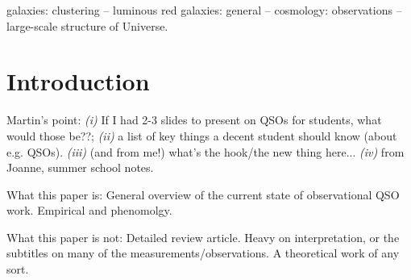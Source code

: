 \documentclass[usenatbib]{mn2e}
\begin{document}
\begin{keywords}
galaxies: clustering -- luminous red galaxies: general -- cosmology: 
observations -- large-scale structure of Universe.
\end{keywords}


\section{Introduction}

\cite{Hunt04}
\citet{Richards06}
\citet{Croom09a}
\citet{Croom09b}
\citet{Degraf10}
\citet{Glikman11}
\citet{Glikman11}

Martin's point: {\it (i)} If I had 2-3 slides to present on QSOs for students, what would those be??; {\it (ii)} a list of key things a decent student should know (about e.g. QSOs). {\it (iii)} (and from me!) what's the hook/the new thing here... {\it (iv)} from Joanne, summer school notes. 

What this paper is:  
General overview of the current state of observational QSO work. 
Empirical and phenomolgy. 

What this paper is not: 
Detailed review article. 
Heavy on interpretation, or the subtitles on many of the measurements/observations. 
A theoretical work of any sort. 
\end{document}
